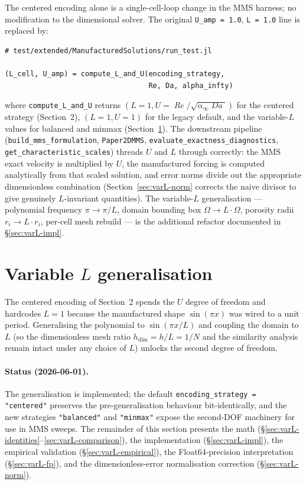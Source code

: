 \documentclass[11pt]{article}
\newcommand{\Reyn}{\operatorname{\mathit{Re}}}
\newcommand{\Damk}{\operatorname{\mathit{Da}}}
\newcommand{\code}[1]{\texttt{#1}}
\begin{document}
The centered encoding alone is a single-cell-loop change in the MMS
harness; no modification to the dimensional solver. The original
\code{U\_amp = 1.0}, \code{L = 1.0} line is replaced by:
\begin{center}
\begin{minipage}{0.9\linewidth}
\begin{lstlisting}[basicstyle=\ttfamily\small, frame=single]
# test/extended/ManufacturedSolutions/run_test.jl

(L_cell, U_amp) = compute_L_and_U(encoding_strategy,
                                  Re, Da, alpha_infty)
\end{lstlisting}
\end{minipage}
\end{center}
\noindent where \code{compute\_L\_and\_U} returns $(L=1, U=\Reyn/\sqrt{\alpha_\infty\Damk})$
for the centered strategy (Section~2), $(L=1, U=1)$ for the legacy
default, and the variable-$L$ values for balanced and minmax
(Section~\ref{sec:varL}). The downstream pipeline
(\code{build\_mms\_formulation}, \code{Paper2DMMS},
\code{evaluate\_exactness\_diagnostics}, \code{get\_characteristic\_scales})
threads $U$ and $L$ through correctly: the MMS exact velocity is multiplied
by $U$, the manufactured forcing is computed analytically from that
scaled solution, and error norms divide out the appropriate
dimensionless combination (Section~\ref{sec:varL-norm} corrects the
naive divisor to give genuinely $L$-invariant quantities). The
variable-$L$ generalisation — polynomial frequency $\pi \to \pi/L$,
domain bounding box $\Omega \to L \cdot \Omega$, porosity radii
$r_i \to L \cdot r_i$, per-cell mesh rebuild — is the additional refactor
documented in §\ref{sec:varL-impl}.

\section{Variable $L$ generalisation}
\label{sec:varL}

The centered encoding of Section~2 spends the $U$ degree of freedom and
hardcodes $L = 1$ because the manufactured shape
$\sin(\pi x)$ was wired to a unit period. Generalising the polynomial
to $\sin(\pi x / L)$ and coupling the domain to $L$ (so the dimensionless
mesh ratio $h_{\text{dim}} = h / L = 1/N$ and the similarity analysis
remain intact under any choice of $L$) unlocks the second degree of
freedom.

\paragraph{Status (2026-06-01).} The generalisation is implemented; the
default \texttt{encoding\_strategy = "centered"} preserves the
pre-generalisation behaviour bit-identically, and the new strategies
\texttt{"balanced"} and \texttt{"minmax"} expose the second-DOF
machinery for use in MMS sweeps. The remainder of this section presents
the math (§\ref{sec:varL-identities}--\ref{sec:varL-comparison}), the
implementation (§\ref{sec:varL-impl}), the empirical validation
(§\ref{sec:varL-empirical}), the Float64-precision interpretation
(§\ref{sec:varL-fp}), and the dimensionless-error normalisation
correction (§\ref{sec:varL-norm}).
\end{document}
